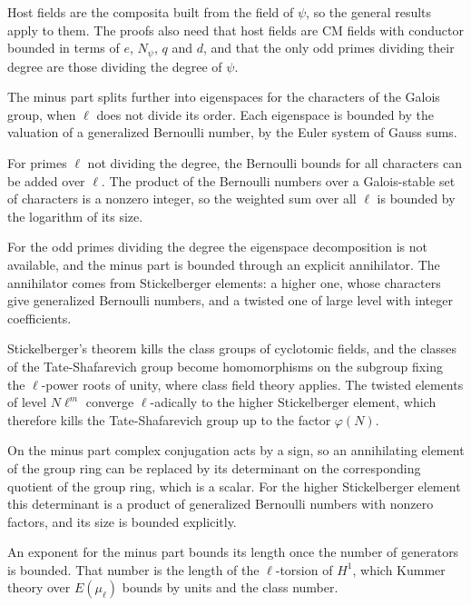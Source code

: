 Host fields are the composita built from the field of $\psi$, so the general results apply to them. The proofs also need that host fields are CM fields with conductor bounded in terms of $e$, $N_\psi$, $q$ and $d$, and that the only odd primes dividing their degree are those dividing the degree of $\psi$.

The minus part splits further into eigenspaces for the characters of the Galois group, when $\ell$ does not divide its order. Each eigenspace is bounded by the valuation of a generalized Bernoulli number, by the Euler system of Gauss sums.

For primes $\ell$ not dividing the degree, the Bernoulli bounds for all characters can be added over $\ell$. The product of the Bernoulli numbers over a Galois-stable set of characters is a nonzero integer, so the weighted sum over all $\ell$ is bounded by the logarithm of its size.

For the odd primes dividing the degree the eigenspace decomposition is not available, and the minus part is bounded through an explicit annihilator. The annihilator comes from Stickelberger elements: a higher one, whose characters give generalized Bernoulli numbers, and a twisted one of large level with integer coefficients.

Stickelberger's theorem kills the class groups of cyclotomic fields, and the classes of the Tate-Shafarevich group become homomorphisms on the subgroup fixing the $\ell$-power roots of unity, where class field theory applies. The twisted elements of level $N\ell^m$ converge $\ell$-adically to the higher Stickelberger element, which therefore kills the Tate-Shafarevich group up to the factor $\varphi(N)$.

On the minus part complex conjugation acts by a sign, so an annihilating element of the group ring can be replaced by its determinant on the corresponding quotient of the group ring, which is a scalar. For the higher Stickelberger element this determinant is a product of generalized Bernoulli numbers with nonzero factors, and its size is bounded explicitly.

An exponent for the minus part bounds its length once the number of generators is bounded. That number is the length of the $\ell$-torsion of $H^1$, which Kummer theory over $E(\mu_\ell)$ bounds by units and the class number.

